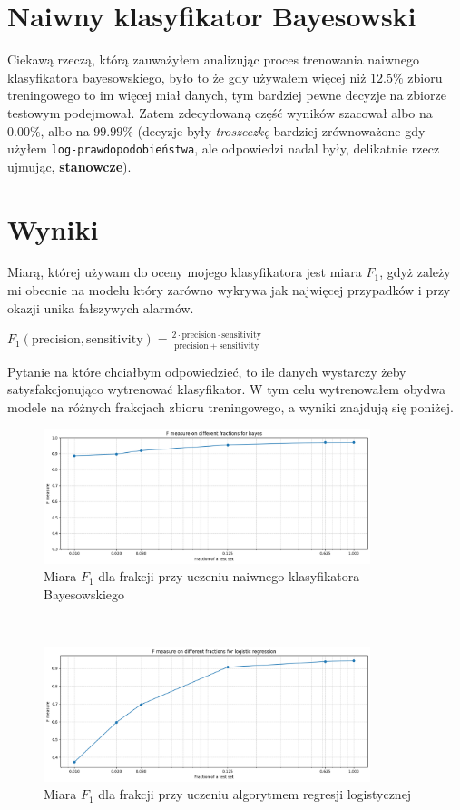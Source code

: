 \documentclass[polish,12pt,a4paper]{extarticle}
\begin{document}
\section*{Naiwny klasyfikator Bayesowski}

Ciekawą rzeczą, którą zauważyłem analizując proces trenowania naiwnego klasyfikatora bayesowskiego, było to że gdy używałem więcej niż $12.5\%$ zbioru treningowego to im więcej miał danych, tym bardziej pewne decyzje na zbiorze testowym podejmował. Zatem zdecydowaną część wyników szacował albo na $0.00\%$, albo na $99.99\%$ (decyzje były \textit{troszeczkę} bardziej zrównoważone gdy użyłem \texttt{log-prawdopodobieństwa}, ale odpowiedzi nadal były, delikatnie rzecz ujmując, \textbf{stanowcze}).

\section*{Wyniki}
Miarą, której używam do oceny mojego klasyfikatora jest miara $F_1$, gdyż zależy mi obecnie na modelu który zarówno wykrywa jak najwięcej przypadków i przy okazji unika fałszywych alarmów. \begin{center}
$F_1(\mathrm{precision}, \mathrm{sensitivity}) = \frac{2 \cdot \mathrm{precision} \cdot \mathrm{sensitivity}}{\mathrm{precision} + \mathrm{sensitivity}}$
\end{center}
Pytanie na które chciałbym odpowiedzieć, to ile danych wystarczy żeby satysfakcjonująco wytrenować klasyfikator. W tym celu wytrenowałem obydwa modele na różnych frakcjach zbioru treningowego, a wyniki znajdują się poniżej.
\begin{figure}[h!]
    \centering
    \includegraphics[width=0.85\textwidth]{img/bayes_frac_better.png}
    \caption{Miara $F_1$ dla frakcji przy uczeniu naiwnego klasyfikatora Bayesowskiego}
\end{figure} \\
\begin{figure}[h!]
    \centering
    \includegraphics[width=0.85\textwidth]{img/logistic_frac.png}
    \caption{Miara $F_1$ dla frakcji przy uczeniu algorytmem regresji logistycznej}
\end{figure} \\
\end{document}
